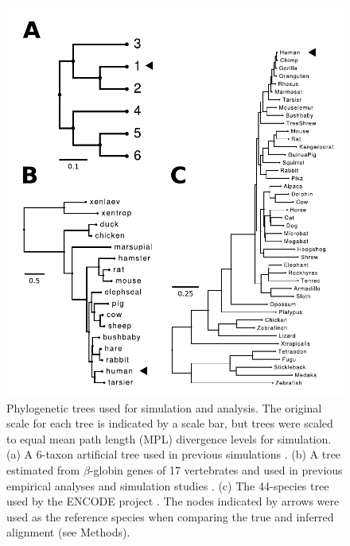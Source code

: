 \documentclass{mbe}
\begin{document}
\begin{figure}[t]
\begin{center}
\includegraphics[scale=0.5]{fig1.pdf}
\end{center}
\caption{Phylogenetic trees used for simulation and analysis. The
  original scale for each tree is indicated by a scale bar, but trees
  were scaled to equal mean path length (MPL) divergence levels for
  simulation. (a) A 6-taxon artificial tree used in previous
  simulations
  \citep{Anisimova2001Accuracy,Massingham2005Detecting}. (b) A tree
  estimated from $\beta$-globin genes of 17 vertebrates and used in
  previous empirical analyses and simulation studies
  \citep{Anisimova2001Accuracy,Anisimova2002Accuracy}. (c) The
  44-species tree used by the ENCODE project
  \citep{2007Identification,Nikolaev2007Early}. The nodes indicated by
  arrows were used as the reference species when comparing the true
  and inferred alignment (see Methods).}
\label{fig_1}
\end{figure}
\end{document}
